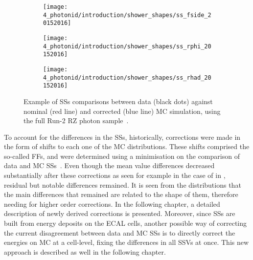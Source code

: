 \begin{figure}[ht!]
    \centering
    \begin{subfigure}[h]{0.32\linewidth}
        \centering
        \texttt{[image: 4\_photonid/introduction/shower\_shapes/ss\_fside\_20152016]}
        \caption{\fside}
        \label{fig:pid_ss:ss_differences:ss:fside}
    \end{subfigure}
    \hfill
    \begin{subfigure}[h]{0.32\linewidth}
        \centering
        \texttt{[image: 4\_photonid/introduction/shower\_shapes/ss\_rphi\_20152016]}
        \caption{\rphi}
        \label{fig:pid_ss:ss_differences:ss:rphi}
    \end{subfigure}
    \hfill
    \begin{subfigure}[h]{0.32\linewidth}
        \centering
        \texttt{[image: 4\_photonid/introduction/shower\_shapes/ss\_rhad\_20152016]}
        \caption{\rhad}
        \label{fig:pid_ss:ss_differences:ss:rhad}
    \end{subfigure}
    \caption{Example of \acp{SS} comparisons between data (black dots) against nominal (red line) and corrected (blue line) \ac{MC} simulation, using the full Run-2 \ac{RZ} photon sample~\cite{ATLAS-EGamma-Calibration-2015-2016}.}
    \label{fig:pid_ss:ss_differences:ss}
\end{figure}

To account for the differences in the \acp{SS}, historically, corrections were made in the form of shifts to each one of the \ac{MC} distributions. These shifts comprised the so-called \acfp{FF}, and were determined using a \chisq minimisation on the comparison of data and \ac{MC} \acp{SS}~\cite{ATLAS-EGamma-Performance-2015-2016,ATLAS-EGamma-Performance-2015-2017}.
Even though the mean value differences decreased substantially after these corrections as seen for example in the case of \fside in \Fig{\ref{fig:pid_ss:ss_differences:ss:fside}}, residual but notable differences remained. It is seen from the distributions that the main differences that remained are related to the shape of them, therefore needing for higher order corrections. In the following chapter, a detailed description of newly derived corrections is presented.
Moreover, since \acp{SS} are built from energy deposits on the \ac{ECAL} cells, another possible way of correcting the current disagreement between data and \ac{MC} \acp{SS} is to directly correct the energies on \ac{MC} at a cell-level, fixing the differences in all \acp{SSV} at once. This new approach is described as well in the following chapter.
